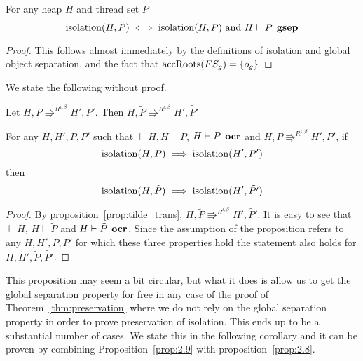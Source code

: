 \begin{proposition} \label{prop:2.8}
  For any heap $H$ and thread set $P$
  \begin{equation*}
    \mbox{$\mathrm{isolation}$}{(H, \tilde{P})} \iff \mbox{$\mathrm{isolation}$}{(H, P)} \text{ and } H \vdash P
    \:\: \mbox{\bf gsep} 
  \end{equation*}
\end{proposition}

\begin{proof}
  This follows almost immediately by the definitions of isolation and global
  object separation, and the fact that $\mbox{$\mathrm{accRoots}$}(FS_g) = \left\{
    o_g \right\}$ 
\end{proof}

We state the following without proof.
\begin{proposition} \label{prop:tilde_trans}
  Let $H, P \Rrightarrow^{R^{\iota, \beta}} H', P'$. Then $H, \tilde{P}
  \Rrightarrow^{R^{\iota, \beta}} H', \tilde{P'}$
\end{proposition}

\begin{proposition} \label{prop:2.9}
  For any $H, H', P, P'$ such that $\vdash H, H \vdash P$, $H \vdash P \:\:
  \mbox{\bf ocr}$ and $H, P \Rrightarrow^{R^{\iota, \beta}} H', P'$, if
  \begin{equation*}
      \mbox{$\mathrm{isolation}$}(H, P) 
      \implies 
      \mbox{$\mathrm{isolation}$}(H', P')
  \end{equation*}
  then
  \begin{equation*}
    \mbox{$\mathrm{isolation}$}(H, \tilde{P}) \implies \mbox{$\mathrm{isolation}$}(H', \tilde{P'})
  \end{equation*}
\end{proposition}

\begin{proof}
  By proposition~\ref{prop:tilde_trans}, $H, \tilde{P} \Rrightarrow^{R^{\iota,
  \beta}} H', \tilde{P'}$. It is easy to see that $\vdash H$, $H \vdash
  \tilde{P}$ and $H \vdash \tilde{P} \:\: \mbox{\bf ocr}$.
  Since the assumption of the proposition refers to any $H, H', P, P'$ for which
  these three properties hold the statement also holds for $H, H',
  \tilde{P}, \tilde{P'}$.
\end{proof}

\begin{remark}
  This proposition may seem a bit circular, but what it does is allow us to get
  the global separation property for free in any case of the proof of
  Theorem~\ref{thm:preservation} where we do not rely on the global separation
  property in order to prove preservation of isolation. This ends up to be a
  substantial number of cases. We state this in the following corollary and it
  can be proven by combining Proposition~\ref{prop:2.9} with
  proposition~\ref{prop:2.8}. 
\end{remark}

